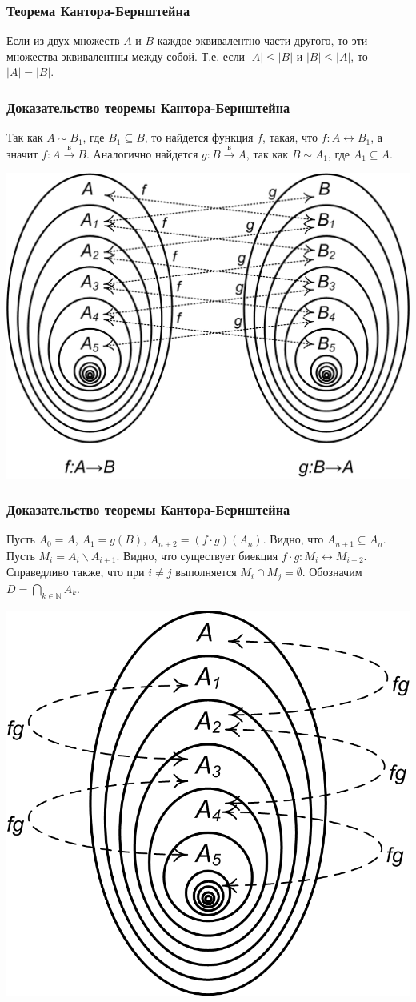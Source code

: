 \begin{frame}
    \frametitle{Теорема Кантора-Бернштейна}
    
    \begin{theorem} 
        Если из двух множеств $A$ и $B$ каждое эквивалентно части другого, то эти множества эквивалентны между собой. Т.е. если $|A|\leq|B|$ и $|B|\leq|A|$, то $|A|=|B|$.
    \end{theorem}
\end{frame}

\begin{frame}
    \frametitle{Доказательство теоремы Кантора-Бернштейна}
    
    Так как $A\sim B_1$, где $B_1\subseteq B$, то найдется функция $f$, такая, что $f:A\leftrightarrow B_1$, а значит $f:A\xrightarrow{\text{в}}B$. Аналогично найдется $g:B\xrightarrow{\text{в}}A$, так как $B\sim A_1$, где $A_1\subseteq A$.
    
    \begin{center}
        \includegraphics[width=.6\textwidth]{fig/kantorBernstein1}
    \end{center}
\end{frame}

\begin{frame}
    \frametitle{Доказательство теоремы Кантора-Бернштейна}
    
    Пусть $A_0=A$, $A_1=g(B)$, $A_{n+2}=(f\cdot g)(A_n)$. Видно, что $A_{n+1}\subseteq A_n$. Пусть $M_i=A_i\backslash A_{i+1}$. Видно, что существует биекция $f\cdot g:M_{i}\leftrightarrow M_{i+2}$. Справедливо также, что при $i\neq j$ выполняется $M_i\cap M_j=\emptyset$. Обозначим $D=\bigcap_{k\in\mathbb{N}} A_k$. 

    \begin{center}
        \includegraphics[width=.45\textwidth]{fig/kantorBernstein2}
    \end{center}
\end{frame}

